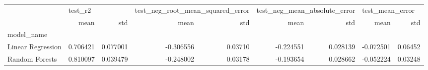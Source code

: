 \begin{tabular}{lrrrrrrrr}
\toprule
{} & \multicolumn{2}{l}{test\_r2} & \multicolumn{2}{l}{test\_neg\_root\_mean\_squared\_error} & \multicolumn{2}{l}{test\_neg\_mean\_absolute\_error} & \multicolumn{2}{l}{test\_mean\_error} \\
{} &      mean &       std &                             mean &      std &                         mean &       std &            mean &      std \\
model\_name        &           &           &                                  &          &                              &           &                 &          \\
\midrule
Linear Regression &  0.706421 &  0.077001 &                        -0.306556 &  0.03710 &                    -0.224551 &  0.028139 &       -0.072501 &  0.06452 \\
Random Forests    &  0.810097 &  0.039479 &                        -0.248002 &  0.03178 &                    -0.193654 &  0.028662 &       -0.052224 &  0.03248 \\
\bottomrule
\end{tabular}
